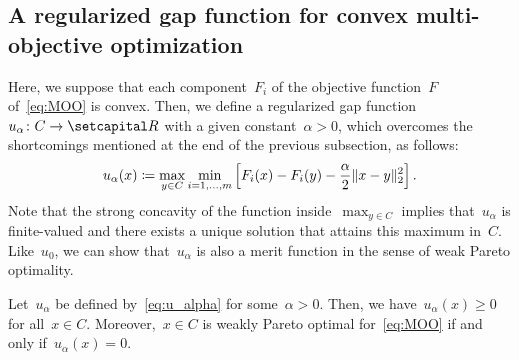 \documentclass[../../main]{subfiles}
\begin{document}
\subsection{A regularized gap function for convex multi-objective optimization} \label{sec:merit:merit:reg_gap}
Here, we suppose that each component~$F_i$ of the objective function~$F$ of~\cref{eq:MOO} is convex.
Then, we define a regularized gap function~$u_\alpha \colon C \to \setR$ with a given constant~$\alpha > 0$, which overcomes the shortcomings mentioned at the end of the previous subsection, as follows:
\begin{equation} \label{eq:u_alpha}
    u_\alpha(x) \coloneqq \max_{y \in C} \min_{i = 1, \dots, m} \left[ F_i(x) - F_i(y) - \frac{\alpha}{2}\lVert x - y\rVert_2^2 \right] 
.\end{equation} 
Note that the strong concavity of the function inside~$\max_{y \in C}$ implies that~$u_\alpha$ is finite-valued and there exists a unique solution that attains this maximum in~$C$.
Like~$u_0$, we can show that~$u_\alpha$ is also a merit function in the sense of weak Pareto optimality.
\begin{theorem} \label{thm:u_alpha}
    Let~$u_\alpha$ be defined by~\cref{eq:u_alpha} for some~$\alpha > 0$.
    Then, we have~$u_\alpha(x) \ge 0$ for all~$x \in C$.
    Moreover,~$x \in C$ is weakly Pareto optimal for~\cref{eq:MOO} if and only if~$u_\alpha(x) = 0$.
\end{theorem}
\end{document}
